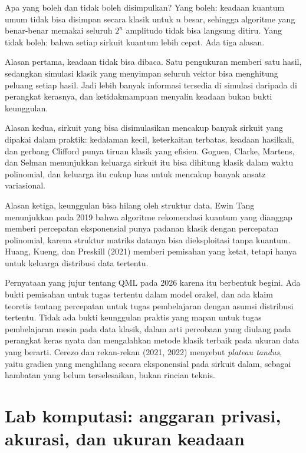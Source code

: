 Apa yang boleh dan tidak boleh disimpulkan? Yang boleh: keadaan kuantum umum tidak bisa
disimpan secara klasik untuk $n$ besar, sehingga algoritme yang benar-benar memakai
seluruh $2^{n}$ amplitudo tidak bisa langsung ditiru. Yang tidak boleh: bahwa setiap
sirkuit kuantum lebih cepat. Ada tiga alasan.

Alasan pertama, keadaan tidak bisa dibaca. Satu pengukuran memberi satu hasil, sedangkan
simulasi klasik yang menyimpan seluruh vektor bisa menghitung peluang setiap hasil. Jadi
lebih banyak informasi tersedia di simulasi daripada di perangkat kerasnya, dan
ketidakmampuan menyalin keadaan bukan bukti keunggulan.

Alasan kedua, sirkuit yang bisa disimulasikan mencakup banyak sirkuit yang dipakai dalam
praktik: kedalaman kecil, keterkaitan terbatas, keadaan hasilkali, dan gerbang Clifford
punya tiruan klasik yang efisien. Goguen, Clarke, Martens, dan Selman menunjukkan
keluarga sirkuit itu bisa dihitung klasik dalam waktu polinomial, dan keluarga itu cukup
luas untuk mencakup banyak ansatz variasional.

Alasan ketiga, keunggulan bisa hilang oleh struktur data. Ewin Tang menunjukkan pada
2019 bahwa algoritme rekomendasi kuantum yang dianggap memberi percepatan eksponensial
punya padanan klasik dengan percepatan polinomial, karena struktur matriks datanya bisa
dieksploitasi tanpa kuantum. Huang, Kueng, dan Preskill (2021) memberi pemisahan yang
ketat, tetapi hanya untuk keluarga distribusi data tertentu.


Pernyataan yang jujur tentang QML pada 2026 karena itu berbentuk begini. Ada bukti
pemisahan untuk tugas tertentu dalam model orakel, dan ada klaim teoretis tentang
percepatan untuk tugas pembelajaran dengan asumsi distribusi tertentu. Tidak ada bukti
keunggulan praktis yang mapan untuk tugas pembelajaran mesin pada data klasik, dalam
arti percobaan yang diulang pada perangkat keras nyata dan mengalahkan metode klasik
terbaik pada ukuran data yang berarti. Cerezo dan rekan-rekan (2021, 2022) menyebut
\emph{plateau tandus}, yaitu gradien yang menghilang secara eksponensial pada sirkuit
dalam, sebagai hambatan yang belum terselesaikan, bukan rincian teknis.

\section{Lab komputasi: anggaran privasi, akurasi, dan ukuran keadaan}

